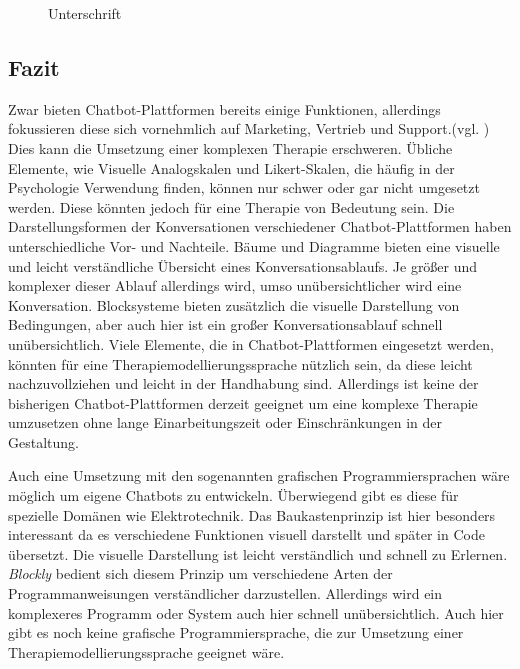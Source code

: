 \begin{figure}[h]
\centering
{}
\caption{Unterschrift}
\label{methVorgehen}
\end{figure}

\subsection{Fazit}

Zwar bieten Chatbot-Plattformen bereits einige Funktionen, allerdings fokussieren diese sich vornehmlich auf Marketing, Vertrieb und Support.(vgl. \cite{Chatfuel3:online} \cite{Converse15:online} \cite{ManyChat78:online}) Dies kann die Umsetzung einer komplexen Therapie erschweren. Übliche Elemente, wie Visuelle Analogskalen und Likert-Skalen, die häufig in der Psychologie Verwendung finden, können nur schwer oder gar nicht umgesetzt werden. Diese könnten jedoch für eine Therapie von Bedeutung sein. Die Darstellungsformen der Konversationen verschiedener Chatbot-Plattformen haben unterschiedliche Vor- und Nachteile. Bäume und Diagramme bieten eine visuelle und leicht verständliche Übersicht eines Konversationsablaufs. Je größer und komplexer dieser Ablauf allerdings wird, umso unübersichtlicher wird eine Konversation. Blocksysteme bieten zusätzlich die visuelle Darstellung von Bedingungen, aber auch hier ist ein großer Konversationsablauf schnell unübersichtlich. Viele Elemente, die in Chatbot-Plattformen eingesetzt werden, könnten für eine Therapiemodellierungssprache nützlich sein, da diese leicht nachzuvollziehen und leicht in der Handhabung sind. Allerdings ist keine der bisherigen Chatbot-Plattformen derzeit geeignet um eine komplexe Therapie umzusetzen ohne lange Einarbeitungszeit oder Einschränkungen in der Gestaltung. 

Auch eine Umsetzung mit den sogenannten grafischen Programmiersprachen wäre möglich um eigene Chatbots zu entwickeln. Überwiegend gibt es diese für spezielle Domänen wie Elektrotechnik. Das Baukastenprinzip ist hier besonders interessant da es verschiedene Funktionen visuell darstellt und später in Code übersetzt. Die visuelle Darstellung ist leicht verständlich und schnell zu Erlernen. \emph{Blockly} bedient sich diesem Prinzip um verschiedene Arten der Programmanweisungen verständlicher darzustellen. Allerdings wird ein komplexeres Programm oder System auch hier schnell unübersichtlich. Auch hier gibt es noch keine grafische Programmiersprache, die zur Umsetzung einer Therapiemodellierungssprache geeignet wäre. 

